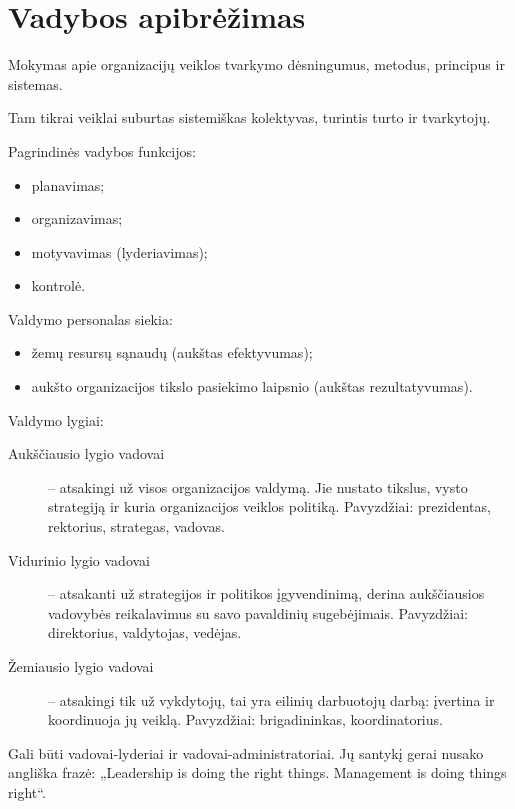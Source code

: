 \chapter{Vadybos apibrėžimas}

\begin{defn}[Vadyba]
  Mokymas apie organizacijų veiklos tvarkymo dėsningumus, metodus,
  principus ir sistemas.
\end{defn}

\begin{defn}[Organizacija]
  Tam tikrai veiklai suburtas sistemiškas kolektyvas, turintis turto ir
  tvarkytojų.
\end{defn}

Pagrindinės vadybos funkcijos:
\begin{itemize}
  \item planavimas;
  \item organizavimas;
  \item motyvavimas (lyderiavimas);
  \item kontrolė.
\end{itemize}

Valdymo personalas siekia:
\begin{itemize}
  \item žemų resursų sąnaudų (aukštas efektyvumas);
  \item aukšto organizacijos tikslo pasiekimo laipsnio (aukštas
  rezultatyvumas).
\end{itemize}

Valdymo lygiai:
\begin{description}
  \item[Aukščiausio lygio vadovai] – atsakingi už visos organizacijos
    valdymą. Jie nustato tikslus, vysto strategiją ir kuria organizacijos
    veiklos politiką. Pavyzdžiai: prezidentas, rektorius, strategas,
    vadovas.
  \item[Vidurinio lygio vadovai] – atsakanti už strategijos ir politikos
    įgyvendinimą, derina aukščiausios vadovybės reikalavimus su savo
    pavaldinių sugebėjimais. Pavyzdžiai: direktorius, valdytojas,
    vedėjas.
  \item[Žemiausio lygio vadovai] – atsakingi tik už vykdytojų, tai yra
    eilinių darbuotojų darbą: įvertina ir koordinuoja jų veiklą.
    Pavyzdžiai: brigadininkas, koordinatorius.
\end{description}

Gali būti vadovai-lyderiai ir vadovai-administratoriai. Jų santykį
gerai nusako angliška frazė: „Leadership is doing the right things.
Management is doing things right“.


